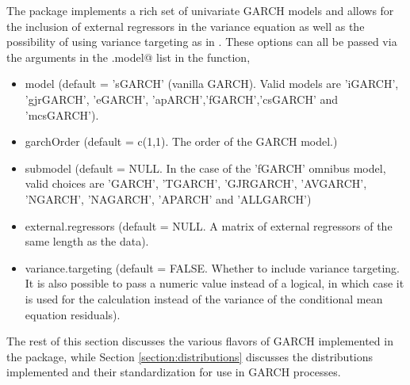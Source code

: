The \verb@rugarch@ package implements a rich set of univariate GARCH models and
allows for the inclusion of external regressors in the variance equation as well
as the possibility of using variance targeting as in \cite{Engle1995a}.
These options can all be passed via the arguments in the \verb@variance.model@
list in the \verb@ugarchspec@ function,
\begin{itemize}
\item model			(default = 'sGARCH' (vanilla GARCH).
Valid models are 'iGARCH', 'gjrGARCH', 'eGARCH', 'apARCH','fGARCH','csGARCH' and 'mcsGARCH').
\item garchOrder	(default = c(1,1).  The order of the GARCH model.)
\item submodel  	(default = NULL. In the case of the 'fGARCH'
omnibus model, valid choices are 'GARCH', 'TGARCH', 'GJRGARCH', 'AVGARCH',
'NGARCH', 'NAGARCH', 'APARCH' and 'ALLGARCH')
\item external.regressors (default = NULL. A matrix of external regressors of
the same length as the data).
\item variance.targeting  (default = FALSE. Whether to include variance
targeting. It is also possible to pass a numeric value instead of a logical, in which case it
is used for the calculation instead of the variance of the conditional mean equation residuals).
\end{itemize}
The rest of this section discusses the various flavors of GARCH implemented in
the package, while  Section \ref{section:distributions} discusses the
distributions implemented and their standardization for use in GARCH processes.

